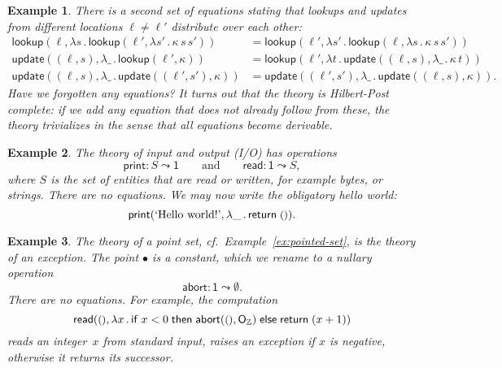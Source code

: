 \documentclass{amsart}
\newcommand{\ZZ}{\mathbb{Z}} %
\newcommand{\lam}[1]{\lambda #1 \,.\,}
\newcommand{\opdecl}[3]{#1 : #2 \leadsto #3} %
\newcommand{\one}{\mathsf{1}} %
\newcommand{\unit}{{\text{\small$()$}}} %
\newcommand{\cond}[3]{\mathsf{if}\;#1\;\mathsf{then}\;#2\;\mathsf{else}\;#3}
\newcommand{\kode}[1]{\mathsf{#1}}
\newcommand{\opcall}[3]{\kode{#1}(#2, #3)}
\newcommand{\return}[1]{\kode{return}\;#1}
\newtheorem{example}{Example}[section]
\begin{document}
\begin{example}
  There is a second set of equations stating that lookups and updates from
  \emph{different} locations $\ell \neq \ell'$ distribute over each other:
  \begin{align*}
    \opcall{lookup}{\ell}{
       \lam{s} \opcall{lookup}{\ell'}{\lam{s'} \kappa \, s \, s'}
    } &=
    \opcall{lookup}{\ell'}{
       \lam{s'} \opcall{lookup}{\ell}{\lam{s} \kappa \, s \, s'}
    }
    \\
    \opcall{update}{(\ell, s)}{
       \lam{\_} \opcall{lookup}{\ell'}{\kappa}
    } &=
    \opcall{lookup}{\ell'}{
       \lam{t} \opcall{update}{(\ell, s)}{
          \lam{\_} \kappa \, t
       }
    } \\
    \opcall{update}{(\ell, s)}{
       \lam{\_} \opcall{update}{(\ell', s')}{\kappa}
    } &=
    \opcall{update}{(\ell', s')}{
       \lam{\_} \opcall{update}{(\ell, s)}{\kappa}
    }.
  \end{align*}
  Have we forgotten any equations?
  It turns out that the theory is Hilbert-Post complete: if we add any equation
  that does not already follow from these, the theory trivializes in the sense
  that all equations become derivable.
\end{example}

\begin{example}
  \label{ex:theory-io}
  The theory of \emph{input and output} (I/O) has operations
  \begin{equation*}
    \opdecl{\kode{print}}{S}{\one}
    \qquad\text{and}\qquad
    \opdecl{\kode{read}}{\one}{S},
  \end{equation*}
  where $S$ is the set of entities that are read or written, for example bytes,
  or strings. There are no equations. We may now write the obligatory hello world:
  \begin{equation*}
    \opcall{print}{\text{`Hello world!'}}{\lam{\_} \return{\unit}}.
  \end{equation*}
\end{example}

\begin{example}
  \label{ex:theory-exception}
  The theory of a point set, cf.\ Example~\ref{ex:pointed-set}, is the theory of
  an \emph{exception}. The point $\bullet$ is a constant, which we rename to a
  nullary operation
  \begin{equation*}
    \opdecl{\kode{abort}}{\one}{\emptyset}.
  \end{equation*}
  There are no equations. For example, the computation
  \begin{equation*}
    \opcall{read}{\unit}{
      \lam{x}{
        \cond{x < 0}{\opcall{abort}{\unit}{\mathsf{O}_\ZZ}}{\return{(x+1)}}
      }
    }
  \end{equation*}
  reads an integer~$x$ from standard input, raises an exception if $x$ is
  negative, otherwise it returns its successor.
\end{example}
\end{document}
